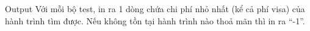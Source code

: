 Output
Với mỗi bộ test, in ra 1 dòng chứa chi phí nhỏ nhất (kể cả phí visa) của hành trình tìm được. Nếu không tồn tại hành trình nào thoả mãn thì in ra “-1”.